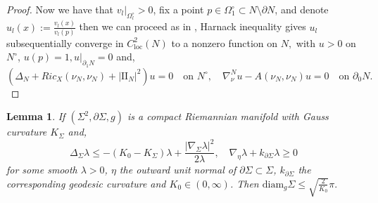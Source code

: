 \documentclass[12pt]{amsart}
\newcommand{\sff}{\mathrm{I\!I}}
\newcommand{\loc}{\text{loc}}
\newcommand{\p}{\partial}
\newtheorem{lemma}[theorem]{Lemma}
\numberwithin{equation}{section}
\begin{document}
\begin{proof}
	
	Now we have that $v_l\rvert_{\Omega^{\circ}_l}>0$, fix a point $p\in \Omega_1^{\circ} \subset N\setminus \p N$,  and denote $u_l(x) :=\frac{v_l(x)}{v_l(p)}$ then we can proceed as in \cite{FischSchoe1980-StructureCompleteStable},  Harnack inequality gives $u_l$ subsequentially converge in $C^{2}_{\loc}(N)$ to a nonzero function on $N,$ with $u>0$ on $N^{\circ}$, $u(p)=1, u\rvert_{\p_1 N}=0$ and,
		\begin{equation}\label{eigen1}
			(\Delta_N +Ric_X(\nu_N,\nu_N)+|\sff_N|^2)u = 0 \quad \text{on } N^{\circ}, \quad \nabla^N_{\nu}u-A(\nu_N,\nu_N)u=0 \quad \text{on } \partial_0 N.
		\end{equation}
\end{proof}

\begin{lemma}\label{appen2}
		If $(\Sigma^2,\partial \Sigma,g)$ is a compact Riemannian manifold with Gauss curvature $K_{\Sigma}$ and,
		\begin{equation}\label{appen}
			\Delta_{\Sigma} \lambda \leq -(K_0-K_{\Sigma})\lambda+\frac{|\nabla_{\Sigma}\lambda|^2}{2\lambda}, \quad\nabla_{\eta}\lambda +k_{\partial \Sigma}\lambda \geq 0
		\end{equation}
		for some smooth $\lambda>0$, $\eta$ the outward unit normal of  $\partial\Sigma \subset \Sigma$, $k_{\partial \Sigma}$ the corresponding geodesic curvature and $K_{0}\in(0,\infty)$. Then $\text{diam}_g\Sigma\leq \sqrt{\frac{2}{K_0}}\pi.$
\end{lemma}
\end{document}
